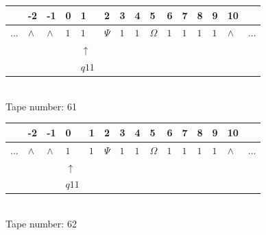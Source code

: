 \documentclass[11pt]{article}
\begin{document}
\begin{table}[H]
\centering
\begin{tabular}{lllllllllllllll}
 & -2 & -1 & 0 & 1 & 2 & 3 & 4 & 5 & 6 & 7 & 8 & 9 & 10 & \\
\hline
$...$ & \multicolumn{1}{|l|}{$\wedge$} & \multicolumn{1}{|l|}{$\wedge$} & \multicolumn{1}{|l|}{$1$} & \multicolumn{1}{|l|}{$1$} & \multicolumn{1}{|l|}{$\Psi$} & \multicolumn{1}{|l|}{$1$} & \multicolumn{1}{|l|}{$1$} & \multicolumn{1}{|l|}{$\Omega$} & \multicolumn{1}{|l|}{$1$} & \multicolumn{1}{|l|}{$1$} & \multicolumn{1}{|l|}{$1$} & \multicolumn{1}{|l|}{$1$} & \multicolumn{1}{|l|}{$\wedge$} & $...$\\
\hline
&  &  &  & $\uparrow$ &  &  &  &  &  &  &  &  &  &  \\
&  &  &  & $ q11 $ &  &  &  &  &  &  &  &  &  &  \\
\end{tabular}
\\
Tape number: 61
\noindent\makebox[\linewidth]{\hdashrule{\textwidth}{1pt}{1pt}}\end{table}

\begin{table}[H]
\centering
\begin{tabular}{lllllllllllllll}
 & -2 & -1 & 0 & 1 & 2 & 3 & 4 & 5 & 6 & 7 & 8 & 9 & 10 & \\
\hline
$...$ & \multicolumn{1}{|l|}{$\wedge$} & \multicolumn{1}{|l|}{$\wedge$} & \multicolumn{1}{|l|}{$1$} & \multicolumn{1}{|l|}{$1$} & \multicolumn{1}{|l|}{$\Psi$} & \multicolumn{1}{|l|}{$1$} & \multicolumn{1}{|l|}{$1$} & \multicolumn{1}{|l|}{$\Omega$} & \multicolumn{1}{|l|}{$1$} & \multicolumn{1}{|l|}{$1$} & \multicolumn{1}{|l|}{$1$} & \multicolumn{1}{|l|}{$1$} & \multicolumn{1}{|l|}{$\wedge$} & $...$\\
\hline
&  &  & $\uparrow$ &  &  &  &  &  &  &  &  &  &  &  \\
&  &  & $ q11 $ &  &  &  &  &  &  &  &  &  &  &  \\
\end{tabular}
\\
Tape number: 62
\noindent\makebox[\linewidth]{\hdashrule{\textwidth}{1pt}{1pt}}\end{table}
\end{document}

